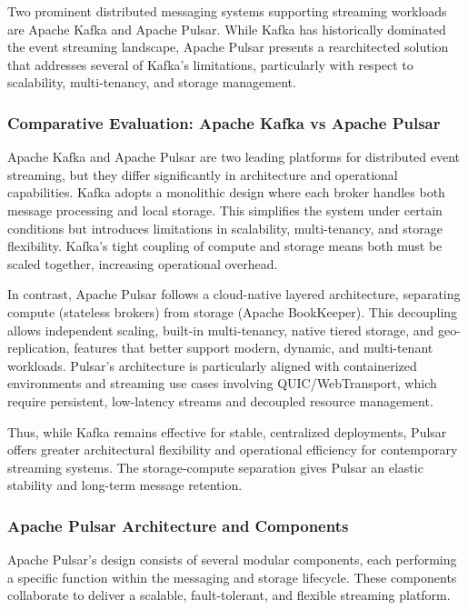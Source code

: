 Two prominent distributed messaging systems supporting streaming workloads are Apache Kafka \cite{kreps2011} and Apache Pulsar. While Kafka has historically dominated the event streaming landscape, Apache Pulsar presents a rearchitected solution that addresses several of Kafka's limitations, particularly with respect to scalability, multi-tenancy, and storage management.

\subsubsection{Comparative Evaluation: Apache Kafka vs Apache Pulsar}
Apache Kafka \cite{kreps2011} and Apache Pulsar are two leading platforms for distributed event streaming, but they differ significantly in architecture and operational capabilities. Kafka adopts a monolithic design where each broker handles both message processing and local storage. This simplifies the system under certain conditions but introduces limitations in scalability, multi-tenancy, and storage flexibility. Kafka's tight coupling of compute and storage means both must be scaled together, increasing operational overhead.

In contrast, Apache Pulsar follows a cloud-native layered architecture, separating compute (stateless brokers) from storage (Apache BookKeeper). This decoupling allows independent scaling, built-in multi-tenancy, native tiered storage, and geo-replication, features that better support modern, dynamic, and multi-tenant workloads. Pulsar's architecture is particularly aligned with containerized environments and streaming use cases involving QUIC/WebTransport, which require persistent, low-latency streams and decoupled resource management.

Thus, while Kafka remains effective for stable, centralized deployments, Pulsar offers greater architectural flexibility and operational efficiency for contemporary streaming systems. The storage-compute separation gives Pulsar an elastic stability and long-term message retention.

\subsubsection{Apache Pulsar Architecture and Components}
Apache Pulsar's design consists of several modular components, each performing a specific function within the messaging and storage lifecycle. These components collaborate to deliver a scalable, fault-tolerant, and flexible streaming platform.

